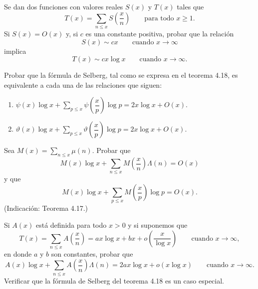 \documentclass[12pt,a4paper]{book}
\begin{document}
    \begin{ejercicio}
        Se dan dos funciones con valores reales $S(x)$ y $T(x)$ tales que
        \begin{equation*}
            T(x)=\sum_{n\leq x}S\left(\frac{x}{n}\right)\qquad\text{para todo } x\geq1.
        \end{equation*}
        Si $S(x)=O(x)$ y, si $c$ es una constante positiva, probar que la relación
        \begin{equation*}
            S(x)\sim cx\qquad\text{cuando } x\to\infty
        \end{equation*}
        implica
        \begin{equation*}
            T(x)\sim cx\log x\qquad\text{cuando } x\to\infty.
        \end{equation*}
    \end{ejercicio}

    \begin{ejercicio}
        Probar que la fórmula de Selberg, tal como se expresa en el teorema 4.18, es
        equivalente a cada una de las relaciones que siguen:
        \begin{enumerate}
            \item[(a)] $\psi(x)\log x+\displaystyle\sum_{p\leq x}\psi\left(\dfrac{x}{p}\right)\log p
            =2x\log x+O(x)$.
            \item[(b)] $\vartheta(x)\log x+\displaystyle\sum_{p\leq x}\vartheta\left(\dfrac{x}{p}\right)\log p
            =2x\log x+O(x)$.
        \end{enumerate}
    \end{ejercicio}

    \begin{ejercicio}
        Sea $M(x)=\sum_{n\leq x}\mu(n)$. Probar que
        \begin{equation*}
            M(x)\log x+\sum_{n\leq x}M\left(\frac{x}{n}\right)\Lambda(n)=O(x)
        \end{equation*}
        y que
        \begin{equation*}
            M(x)\log x+\sum_{p\leq x}M\left(\frac{x}{p}\right)\log p=O(x).
        \end{equation*}
        (Indicación: Teorema 4.17.)
    \end{ejercicio}

    \begin{ejercicio}
        Si $A(x)$ está definida para todo $x>0$ y si suponemos que
        \begin{equation*}
            T(x)=\sum_{n\leq x}A\left(\frac{x}{n}\right)=ax\log x+bx+o\left(\frac{x}{\log x}\right)
            \qquad\text{cuando } x\to\infty,
        \end{equation*}
        en donde $a$ y $b$ son constantes, probar que
        \begin{equation*}
            A(x)\log x+\sum_{n\leq x}A\left(\frac{x}{n}\right)\Lambda(n)=2ax\log x+o(x\log x)
            \qquad\text{cuando } x\to\infty.
        \end{equation*}
        Verificar que la fórmula de Selberg del teorema 4.18 es un caso especial.
    \end{ejercicio}
\end{document}
